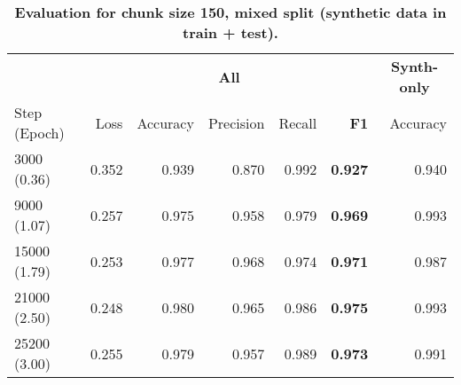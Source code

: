 \begin{table}[H]
\centering
\small
\caption[Evaluation for Chunk Size 150, Mixed Split]{\textbf{Evaluation for chunk size 150, mixed split (synthetic data in train + test).}}
\label{tab:150_mixed}
\begin{tabular}{@{}lrrrr rr@{}} %
\toprule
  & \multicolumn{5}{c}{\textbf{All}} 
  & \multicolumn{1}{c}{\textbf{Synth-only}} \\
\cmidrule(lr){2-6} \cmidrule(lr){7-7}
Step (Epoch) & Loss & Accuracy & Precision & Recall & \textbf{F1} 
& Accuracy \\
\midrule
3000 (0.36) & 0.352 & 0.939 & 0.870 & 0.992 & \textbf{0.927} & 0.940 \\
9000 (1.07) & 0.257 & 0.975 & 0.958 & 0.979 & \textbf{0.969} & 0.993 \\
15000 (1.79) & 0.253 & 0.977 & 0.968 & 0.974 & \textbf{0.971} & 0.987 \\
21000 (2.50) & 0.248 & 0.980 & 0.965 & 0.986 & \textbf{0.975} & 0.993 \\
25200 (3.00) & 0.255 & 0.979 & 0.957 & 0.989 & \textbf{0.973} & 0.991 \\
\bottomrule
\end{tabular}
\end{table}
